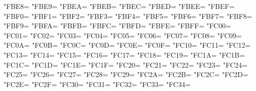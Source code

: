 \XeTeXcharclass"FBE8=\KclassArabU
\XeTeXcharclass"FBE9=\KclassArabU
\XeTeXcharclass"FBEA=\KclassArabU
\XeTeXcharclass"FBEB=\KclassArabU
\XeTeXcharclass"FBEC=\KclassArabU
\XeTeXcharclass"FBED=\KclassArabU
\XeTeXcharclass"FBEE=\KclassArabU
\XeTeXcharclass"FBEF=\KclassArabU
\XeTeXcharclass"FBF0=\KclassArabU
\XeTeXcharclass"FBF1=\KclassArabU
\XeTeXcharclass"FBF2=\KclassArabU
\XeTeXcharclass"FBF3=\KclassArabU
\XeTeXcharclass"FBF4=\KclassArabU
\XeTeXcharclass"FBF5=\KclassArabU
\XeTeXcharclass"FBF6=\KclassArabU
\XeTeXcharclass"FBF7=\KclassArabU
\XeTeXcharclass"FBF8=\KclassArabU
\XeTeXcharclass"FBF9=\KclassArabU
\XeTeXcharclass"FBFA=\KclassArabU
\XeTeXcharclass"FBFB=\KclassArabU
\XeTeXcharclass"FBFC=\KclassArabU
\XeTeXcharclass"FBFD=\KclassArabU
\XeTeXcharclass"FBFE=\KclassArabU
\XeTeXcharclass"FBFF=\KclassArabU
\XeTeXcharclass"FC00=\KclassArabU
\XeTeXcharclass"FC01=\KclassArabU
\XeTeXcharclass"FC02=\KclassArabU
\XeTeXcharclass"FC03=\KclassArabU
\XeTeXcharclass"FC04=\KclassArabU
\XeTeXcharclass"FC05=\KclassArabU
\XeTeXcharclass"FC06=\KclassArabU
\XeTeXcharclass"FC07=\KclassArabU
\XeTeXcharclass"FC08=\KclassArabU
\XeTeXcharclass"FC09=\KclassArabU
\XeTeXcharclass"FC0A=\KclassArabU
\XeTeXcharclass"FC0B=\KclassArabU
\XeTeXcharclass"FC0C=\KclassArabU
\XeTeXcharclass"FC0D=\KclassArabU
\XeTeXcharclass"FC0E=\KclassArabU
\XeTeXcharclass"FC0F=\KclassArabU
\XeTeXcharclass"FC10=\KclassArabU
\XeTeXcharclass"FC11=\KclassArabU
\XeTeXcharclass"FC12=\KclassArabU
\XeTeXcharclass"FC13=\KclassArabU
\XeTeXcharclass"FC14=\KclassArabU
\XeTeXcharclass"FC15=\KclassArabU
\XeTeXcharclass"FC16=\KclassArabU
\XeTeXcharclass"FC17=\KclassArabU
\XeTeXcharclass"FC18=\KclassArabU
\XeTeXcharclass"FC19=\KclassArabU
\XeTeXcharclass"FC1A=\KclassArabU
\XeTeXcharclass"FC1B=\KclassArabU
\XeTeXcharclass"FC1C=\KclassArabU
\XeTeXcharclass"FC1D=\KclassArabU
\XeTeXcharclass"FC1E=\KclassArabU
\XeTeXcharclass"FC1F=\KclassArabU
\XeTeXcharclass"FC20=\KclassArabU
\XeTeXcharclass"FC21=\KclassArabU
\XeTeXcharclass"FC22=\KclassArabU
\XeTeXcharclass"FC23=\KclassArabU
\XeTeXcharclass"FC24=\KclassArabU
\XeTeXcharclass"FC25=\KclassArabU
\XeTeXcharclass"FC26=\KclassArabU
\XeTeXcharclass"FC27=\KclassArabU
\XeTeXcharclass"FC28=\KclassArabU
\XeTeXcharclass"FC29=\KclassArabU
\XeTeXcharclass"FC2A=\KclassArabU
\XeTeXcharclass"FC2B=\KclassArabU
\XeTeXcharclass"FC2C=\KclassArabU
\XeTeXcharclass"FC2D=\KclassArabU
\XeTeXcharclass"FC2E=\KclassArabU
\XeTeXcharclass"FC2F=\KclassArabU
\XeTeXcharclass"FC30=\KclassArabU
\XeTeXcharclass"FC31=\KclassArabU
\XeTeXcharclass"FC32=\KclassArabU
\XeTeXcharclass"FC33=\KclassArabU
\XeTeXcharclass"FC34=\KclassArabU
